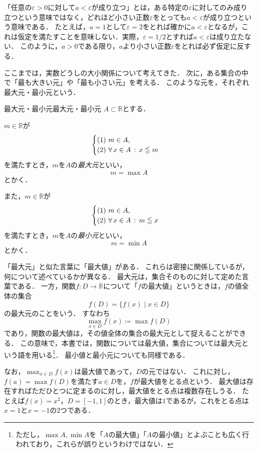 \begin{remark}
  「任意の$\varepsilon > 0$に対して$a < \varepsilon$が成り立つ」とは，ある特定の$\varepsilon$に対してのみ成り立つという意味ではなく，どれほど小さい正数$\varepsilon$をとっても$a < \varepsilon$が成り立つという意味である．
  たとえば，$a = 1$として$\varepsilon = 2$をとれば確かに$a < \varepsilon$となるが，これは仮定を満たすことを意味しない．実際，$\varepsilon = 1/2$とすれば$a < \varepsilon$は成り立たない．
  このように，$a > 0$である限り，$a$より小さい正数$\varepsilon$をとれば必ず仮定に反する．
\end{remark}

ここまでは，実数どうしの大小関係について考えてきた．
次に，ある集合の中で「最も大きい元」や「最も小さい元」を考える．
このような元を，それぞれ最大元・最小元という．

\begin{definition}{最大元・最小元}{最大元・最小元}
  $A \subset \mathbb{R}$とする．

  $m \in \mathbb{R}$が
  \[
    \begin{cases}
      \textup{(1)}\ m \in A,\\
      \textup{(2)}\ \forall\, x \in A \,:\, x \leqq m
    \end{cases}
  \]
  を満たすとき，$m$を$A$の\emph{最大元}といい，
  \[
    m = \max A
  \]
  とかく．

  また，$m \in \mathbb{R}$が
  \[
    \begin{cases}
      \textup{(1)}\ m \in A,\\
      \textup{(2)}\ \forall\, x \in A \,:\, m \leqq x
    \end{cases}
  \]
  を満たすとき，$m$を$A$の\emph{最小元}といい，
  \[
    m = \min A
  \]
  とかく．
\end{definition}

\begin{remark}[最大元と最大値]
  「最大元」と似た言葉に「最大値」がある．
  これらは密接に関係しているが，何について述べているかが異なる．
  最大元は，集合そのものに対して定めた言葉である．
  一方，関数$f \colon D \to \mathbb{R}$について「$f$の最大値」というときは，$f$の値全体の集合
  \[
    f(D) = \{f(x) \mid x \in D\}
  \]
  の最大元のことをいう．
  すなわち
  \[
    \max_{x \in D} f(x) \coloneqq \max f(D)
  \]
  であり，関数の最大値は，その値全体の集合の最大元として捉えることができる．
  この意味で，本書では，関数については最大値，集合については最大元という語を用いる\footnote{%
    ただし，$\max A,\min A$を「$A$の最大値」「$A$の最小値」とよぶことも広く行われており，これらが誤りというわけではない．%
  }．
  最小値と最小元についても同様である．

  なお，$\max_{x \in D} f(x)$は最大値であって，$D$の元ではない．
  これに対し，$f(a) = \max f(D)$を満たす$a \in D$を，$f$が最大値をとる点という．
  最大値は存在すればただひとつに定まるのに対し，最大値をとる点は複数存在しうる．
  たとえば$f(x) = x^{2}$，$D = [-1,1]$のとき，最大値は$1$であるが，これをとる点は$x = 1$と$x = -1$の$2$つである．
\end{remark}

